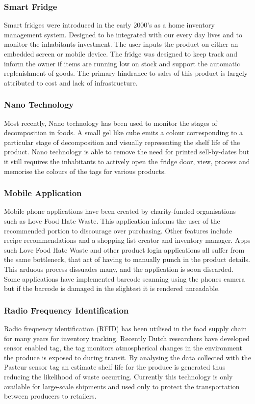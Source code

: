 \documentclass[a4paper, 11pt]{article}
\begin{document}
\subsubsection{Smart Fridge} Smart fridges were introduced in the early 2000's as a home inventory management system. Designed to be integrated with our every day lives and to monitor the inhabitants investment. The user inputs the product on either an embedded screen or mobile device. The fridge was designed to keep track and inform the owner if items are running low on stock and support the automatic replenishment of goods. The primary hindrance to sales of this product is largely attributed to cost and lack of infrastructure. 

\subsubsection{Nano Technology} 
Most recently, Nano technology has been used to monitor the stages of decomposition in foods. A small gel like cube emits a colour corresponding to a particular stage of decomposition and visually representing the shelf life of the product. Nano technology is able to remove the need for printed sell-by-dates but it still requires the inhabitants to actively open the fridge door, view, process and memorise the colours of the tags for various products. 

\subsubsection{Mobile Application} 
Mobile phone applications have been created by charity-funded organisations such as Love Food Hate Waste. This application informs the user of the recommended portion to discourage over purchasing. Other features include recipe recommendations and a shopping list creator and inventory manager. 
Apps such Love Food Hate Waste and other product login applications all suffer from the same bottleneck, that act of having to manually punch in the product details. This arduous process dissuades many, and the application is soon discarded. Some applications have implemented barcode scanning using the phones camera but if the barcode is damaged in the slightest it is rendered unreadable. 

\subsubsection{Radio Frequency Identification} 
Radio frequency identification (RFID) has been utilised in the food supply chain for many years for inventory tracking. Recently Dutch researchers have developed sensor enabled tag, the tag monitors atmospherical changes in the environment the produce is exposed to during transit. By analysing the data collected with the Pasteur sensor tag an estimate shelf life for the produce is generated thus reducing the likelihood of waste occurring. Currently this technology is only available for large-scale shipments and used only to protect the transportation between producers to retailers. 
\end{document}
